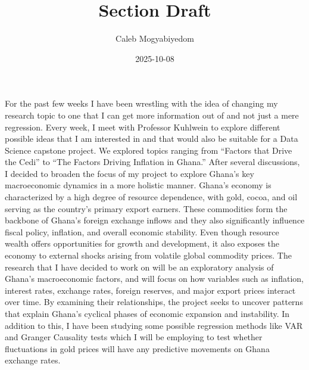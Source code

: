 \documentclass[
]{article}
\title{Section Draft}
\author{Caleb Mogyabiyedom}
\date{2025-10-08}
\begin{document}
\maketitle

For the past few weeks I have been wrestling with the idea of changing
my research topic to one that I can get more information out of and not
just a mere regression. Every week, I meet with Professor Kuhlwein to
explore different possible ideas that I am interested in and that would
also be suitable for a Data Science capstone project. We explored topics
ranging from ``Factors that Drive the Cedi'' to ``The Factors Driving
Inflation in Ghana.'' After several discussions, I decided to broaden
the focus of my project to explore Ghana's key macroeconomic dynamics in
a more holistic manner. Ghana's economy is characterized by a high
degree of resource dependence, with gold, cocoa, and oil serving as the
country's primary export earners. These commodities form the backbone of
Ghana's foreign exchange inflows and they also significantly influence
fiscal policy, inflation, and overall economic stability. Even though
resource wealth offers opportunities for growth and development, it also
exposes the economy to external shocks arising from volatile global
commodity prices. The research that I have decided to work on will be an
exploratory analysis of Ghana's macroeconomic factors, and will focus on
how variables such as inflation, interest rates, exchange rates, foreign
reserves, and major export prices interact over time. By examining their
relationships, the project seeks to uncover patterns that explain
Ghana's cyclical phases of economic expansion and instability. In
addition to this, I have been studying some possible regression methods
like VAR and Granger Causality tests which I will be employing to test
whether fluctuations in gold prices will have any predictive movements
on Ghana exchange rates.
\end{document}
